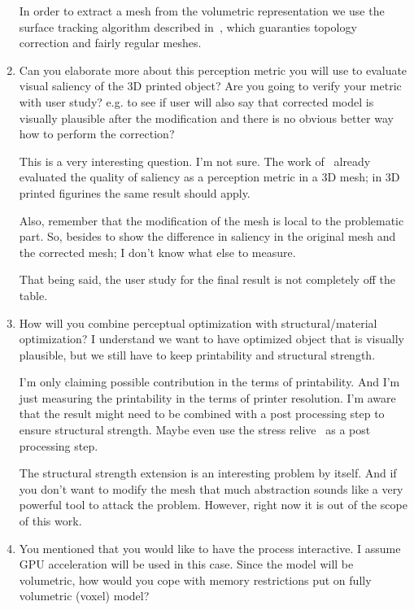 \begin{enumerate}
	In order to extract a mesh from the volumetric representation we use the surface tracking algorithm described in~\cite{Artzy1980}, which guaranties topology correction and fairly regular meshes.
  
	\item Can you elaborate more about this perception metric you will use to evaluate visual saliency of the 3D printed object? Are you going to verify your metric with user study? e.g. to see if user will also say that corrected model is visually plausible after the modification and there is no obvious better way how to perform the correction?
	
	This is a very interesting question. I'm not sure. The work of~\cite{Kim2010} already evaluated the quality of saliency as a perception metric in a 3D mesh; in 3D printed figurines the same result should apply. 
	
	Also, remember that the modification of the mesh is local to the problematic part. So, besides to show the difference in saliency in the original mesh and the corrected mesh; I don't know what else to measure.
	
	That being said, the user study for the final result is not completely off the table.
	
	\item How will you combine perceptual optimization with structural/material optimization? I understand we want to have optimized object that is visually plausible, but we still have to keep printability and structural strength.
	
	I’m only claiming possible contribution in the terms of printability. And I'm just measuring the printability in the terms of printer resolution. I'm aware that the result might need to be combined with a post processing step to ensure structural strength. Maybe even use the stress relive~\cite{Stava2012} as a post processing step.
	
	The structural strength extension is an interesting problem by itself. And if you don't want to modify the mesh that much abstraction sounds like a very powerful tool to attack the problem. However, right now it is out of the scope of this work.
	
	\item You mentioned that you would like to have the process interactive. I assume GPU acceleration will be used in this case. Since the model will be volumetric, how would you cope with memory restrictions put on fully volumetric (voxel) model?
	

\end{enumerate}
